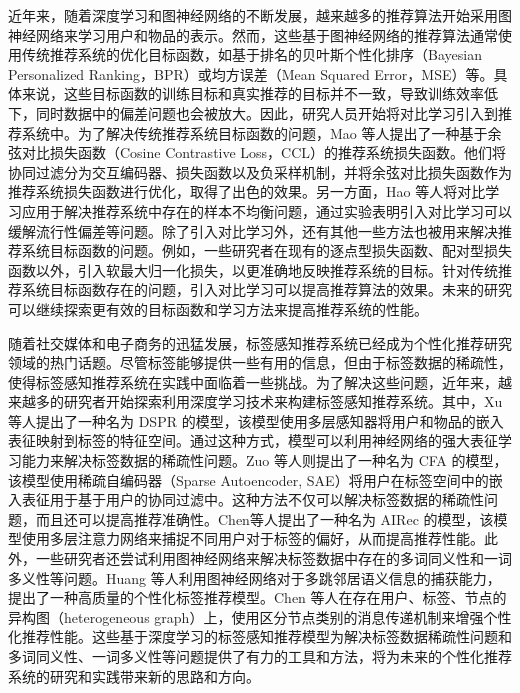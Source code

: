 近年来，随着深度学习和图神经网络的不断发展，越来越多的推荐算法开始采用图神经网络来学习用户和物品的表示。然而，这些基于图神经网络的推荐算法通常使用传统推荐系统的优化目标函数，如基于排名的贝叶斯个性化排序（Bayesian Personalized Ranking，BPR）或均方误差（Mean Squared Error，MSE）等。具体来说，这些目标函数的训练目标和真实推荐的目标并不一致，导致训练效率低下，同时数据中的偏差问题也会被放大\cite{mao_simplex_2021,tang_multi-sample_2021}。因此，研究人员开始将对比学习引入到推荐系统中。为了解决传统推荐系统目标函数的问题，Mao 等人\cite{mao_simplex_2021}提出了一种基于余弦对比损失函数（Cosine Contrastive Loss，CCL）的推荐系统损失函数。他们将协同过滤分为交互编码器、损失函数以及负采样机制，并将余弦对比损失函数作为推荐系统损失函数进行优化，取得了出色的效果。另一方面，Hao 等人\cite{tang_multi-sample_2021}将对比学习应用于解决推荐系统中存在的样本不均衡问题，通过实验表明引入对比学习可以缓解流行性偏差等问题。除了引入对比学习外，还有其他一些方法也被用来解决推荐系统目标函数的问题。例如，一些研究者在现有的逐点型损失函数、配对型损失函数以外，引入软最大归一化损失\cite{wu_effectiveness_2022}，以更准确地反映推荐系统的目标。针对传统推荐系统目标函数存在的问题，引入对比学习可以提高推荐算法的效果。未来的研究可以继续探索更有效的目标函数和学习方法来提高推荐系统的性能。

随着社交媒体和电子商务的迅猛发展，标签感知推荐系统已经成为个性化推荐研究领域的热门话题。尽管标签能够提供一些有用的信息，但由于标签数据的稀疏性，使得标签感知推荐系统在实践中面临着一些挑战。为了解决这些问题，近年来，越来越多的研究者开始探索利用深度学习技术来构建标签感知推荐系统。其中，Xu 等人\cite{xu_tag-aware_2016}提出了一种名为 DSPR 的模型，该模型使用多层感知器将用户和物品的嵌入表征映射到标签的特征空间。通过这种方式，模型可以利用神经网络的强大表征学习能力来解决标签数据的稀疏性问题。Zuo 等人\cite{zuo_tag-aware_2016}则提出了一种名为 CFA 的模型，该模型使用稀疏自编码器（Sparse Autoencoder, SAE）将用户在标签空间中的嵌入表征用于基于用户的协同过滤中。这种方法不仅可以解决标签数据的稀疏性问题，而且还可以提高推荐准确性。Chen等人\cite{chen_airec_2021}提出了一种名为 AIRec 的模型，该模型使用多层注意力网络来捕捉不同用户对于标签的偏好，从而提高推荐性能。此外，一些研究者还尝试利用图神经网络来解决标签数据中存在的多词同义性和一词多义性等问题。Huang 等人\cite{huang_tag-aware_2021}利用图神经网络对于多跳邻居语义信息的捕获能力，提出了一种高质量的个性化标签推荐模型。Chen 等人\cite{chen_tgcn_2020}在存在用户、标签、节点的异构图（heterogeneous graph）上，使用区分节点类别的消息传递机制来增强个性化推荐性能。这些基于深度学习的标签感知推荐模型为解决标签数据稀疏性问题和多词同义性、一词多义性等问题提供了有力的工具和方法，将为未来的个性化推荐系统的研究和实践带来新的思路和方向。

